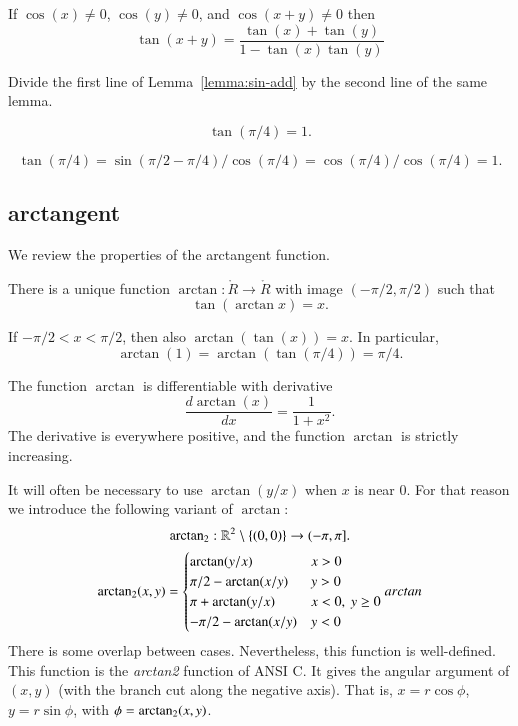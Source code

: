 \begin{lemma}\label{lemma:tan-add}
    If $\cos(x)\ne 0$, $\cos(y)\ne 0$, and $\cos(x+y)\ne0$ then
    $$\tan(x+y) = \frac{\tan(x) + \tan(y) }{ 1 - \tan(x)\tan(y)}$$
\end{lemma}

\begin{proved}
  Divide the first line of Lemma~\ref{lemma:sin-add} by the second
  line of the same lemma.
\swallowed\end{proved}

\begin{lemma}\label{lemma:tan-pi4}
    $$\tan(\pi/4) = 1.$$
\end{lemma}

\begin{proved}
    $$\tan(\pi/4) = \sin(\pi/2-\pi/4)/\cos(\pi/4) =
    \cos(\pi/4)/\cos(\pi/4) = 1.$$
\swallowed\end{proved}


\subsection{arctangent}

We review the properties of the arctangent function.

\begin{definition}[arctangent]\label{def:arctan}
There is a unique function $\arctan:\ring{R}\to\ring{R}$ with
image $(-\pi/2,\pi/2)$ such that
    $$\tan(\arctan x) =x.$$
\end{definition}

If $-\pi/2 < x < \pi/2$, then also $\arctan(\tan(x)) = x$. In
particular,
    $$\arctan(1) = \arctan(\tan(\pi/4)) = \pi/4.$$


The function $\arctan$ is differentiable with derivative%
    $$\frac{d \arctan(x)}{dx} = \frac{1}{1 + x^2}.$$
The derivative is everywhere positive, and the function $\arctan$ is
strictly increasing.


It will often be necessary to use $\arctan(y/x)$ when $x$ is near $0$.
For that reason we introduce the following variant of $\arctan$:
$$
{\operatorname{arctan_2}}: \mathbb{R}^2\setminus\{(0,0)\} \to (-\pi,\pi].
$$
$$
\atn(x,y) = \begin{cases}
   \arctan(y/x) & x > 0\\
   \pi/2- \arctan(x/y) & y > 0 \\
   \pi + \arctan(y/x) & x< 0,\  y\ge 0\\
   -\pi/2- \arctan(x/y) & y< 0 \\
\end{cases}
\index{Index}{arctan}
$$
There is some overlap between cases. Nevertheless, 
this function is well-defined.  
This function is the {\it arctan2} function of ANSI C.  It gives the
angular argument of $(x,y)$ (with the branch cut along the negative axis).
That is, $x = r\cos\phi$, $y=r\sin\phi$, with $\phi={\operatorname{arctan_2}}(x,y)$.


